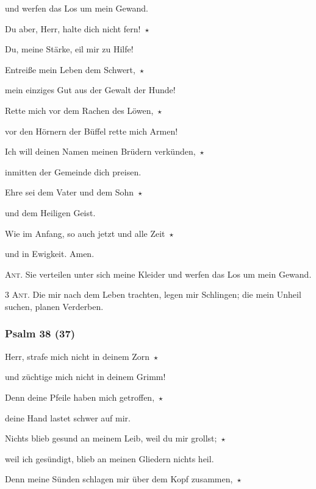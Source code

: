 und werfen das Los um mein Gewand.
 
\noindent Du aber, Herr, halte dich nicht fern!~$\star$~\nopagebreak

Du, meine Stärke, eil mir zu Hilfe!
 
\noindent Entreiße mein Leben dem Schwert,~$\star$~\nopagebreak

mein einziges Gut aus der Gewalt der Hunde!
 
\noindent Rette mich vor dem Rachen des Löwen,~$\star$~\nopagebreak

vor den Hörnern der Büffel rette mich Armen!
 
\noindent Ich will deinen Namen meinen Brüdern verkünden,~$\star$~\nopagebreak

inmitten der Gemeinde dich preisen.

\noindent Ehre sei dem Vater und dem Sohn~$\star$~\nopagebreak

und dem Heiligen Geist.

\noindent Wie im Anfang, so auch jetzt und alle Zeit~$\star$~\nopagebreak

und in Ewigkeit. Amen.

\vspace{10pt}

\noindent \textsc{Ant.} Sie verteilen unter sich meine Kleider und werfen das Los um mein Gewand.

\vspace{10pt}

\noindent \textsc{3 Ant.} Die mir nach dem Leben trachten, legen mir Schlingen; die mein Unheil suchen, planen Verderben.

\subsubsection{Psalm 38 (37)}

\noindent Herr, strafe mich nicht in deinem Zorn~$\star$~\nopagebreak

und züchtige mich nicht in deinem Grimm!
 
\noindent Denn deine Pfeile haben mich getroffen,~$\star$~\nopagebreak

deine Hand lastet schwer auf mir.
 
\noindent Nichts blieb gesund an meinem Leib, weil du mir grollst;~$\star$~\nopagebreak

weil ich gesündigt, blieb an meinen Gliedern nichts heil.
 
\noindent Denn meine Sünden schlagen mir über dem Kopf zusammen,~$\star$~\nopagebreak

